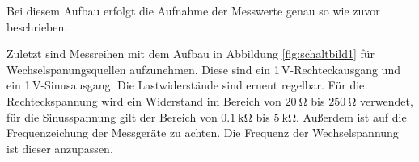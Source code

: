 Bei diesem Aufbau erfolgt die Aufnahme der Messwerte genau so wie zuvor beschrieben.

Zuletzt sind Messreihen mit dem Aufbau in Abbildung \ref{fig:schaltbild1} für
Wechselspanungsquellen aufzunehmen. Diese sind ein 1\,V-Rechteckausgang und ein
1\,V-Sinusausgang. Die Lastwiderstände sind erneut regelbar. Für die Rechteckspannung
wird ein Widerstand im Bereich von $\SI{20}{\ohm}$ bis $\SI{250}{\ohm}$
verwendet, für die Sinusspannung gilt der Bereich von $\SI{0.1}{\kilo\ohm}$ bis
$\SI{5}{\kilo\ohm}$.
Außerdem ist auf die Frequenzeichung der Messgeräte zu achten. Die Frequenz der
Wechselspannung ist dieser anzupassen.
